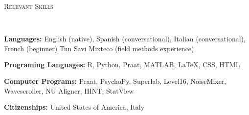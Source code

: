 \documentclass[9pt]{article}
\newenvironment{changemargin}[2]{%
  \begin{list}{}{%
    \setlength{\topsep}{0pt}%
    \setlength{\leftmargin}{#1}%
    \setlength{\rightmargin}{#2}%
    \setlength{\listparindent}{\parindent}%
    \setlength{\itemindent}{\parindent}%
    \setlength{\parsep}{\parskip}%
  }%
  \item[]}{\end{list}
}
\newcommand{\lineover}{
	\begin{changemargin}{-0.05in}{-0.05in}
		\vspace*{-8pt}
		\hrulefill \\
		\vspace*{-2pt}
	\end{changemargin}
}
\newcommand{\header}[1]{
	\begin{changemargin}{-0.5in}{-0.5in}
		\scshape{#1}\\
  	\lineover
	\end{changemargin}
}
\newenvironment{body} {
	\vspace*{-16pt}
	\begin{changemargin}{-0.25in}{-0.5in}
  }	
	{\end{changemargin}
}
\begin{document}
\smallskip


\header{Relevant Skills}

\begin{body}
	\vspace{14pt}
	
	\textbf{Languages:} English (native), Spanish (conversational), Italian (conversational), French (beginner) Tun Savi Mixteco (field methods experience)\\
	\medskip
	
	\textbf{Programing Languages:} R, Python, Praat, MATLAB, LaTeX, CSS, HTML\\
	\medskip

	\textbf{Computer Programs:} Praat, PsychoPy, Superlab, Level16, NoiseMixer, Wavescroller, NU Aligner, HINT, StatView\\
	\medskip
	
	\textbf{Citizenships:} United States of America, Italy\\
	\medskip

\end{body}
\end{document}
